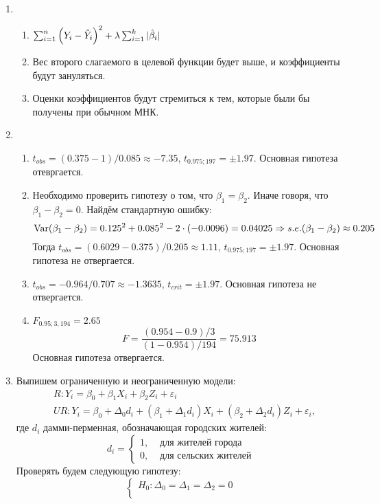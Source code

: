 \begin{enumerate}
\item
\begin{enumerate}
  \item $\sum_{i=1}^n \left(Y_i - \hat Y_i \right)^2 + \lambda \sum_{i=1}^k
  \vert \hat{\beta}_i \vert$
  \item Вес второго слагаемого в целевой функции будет выше, и коэффициенты будут
  зануляться.
  \item Оценки коэффициентов будут стремиться к тем, которые были бы получены
  при обычном МНК.
\end{enumerate}
\item
\begin{enumerate}
  \item $t_{obs} = (0.375 - 1) / 0.085 \approx -7.35$, $t_{0.975; 197} = \pm 1.97$.
  Основная гипотеза отевргается.
  \item Необходимо проверить гипотезу о том, что $\beta_1 = \beta_2$. Иначе говоря,
  что $\beta_1 - \beta_2 = 0$. Найдём стандартную ошибку:
  \[
  \operatorname{Var}(\beta_1 - \beta_2) = 0.125^2 + 0.085^2 - 2 \cdot (-0.0096) = 0.04025 \Rightarrow
  s.e.(\beta_1 - \beta_2) \approx 0.205
  \]
  Тогда $t_{obs} = (0.6029 - 0.375) / 0.205 \approx 1.11$, $t_{0.975; 197} = \pm 1.97$.
  Основная гипотеза не отвергается.
  \item $t_{obs} = -0.964 / 0.707 \approx -1.3635$, $t_{crit} = \pm 1.97$.
  Основная гипотеза не отвергается.
  \item $F_{0.95; 3, 194} = 2.65$
  \[
  F = \frac{(0.954 - 0.9) / 3}{(1 - 0.954) / 194} = 75.913
  \]
  Основная гипотеза отвергается.
\end{enumerate}
\item Выпишем ограниченную и неограниченную модели:
\begin{align*}
  &R: Y_i = \beta_0 + \beta_1 X_i + \beta_2 Z_i + \varepsilon_i \\
  &UR: Y_i = \beta_0 + \Delta_0 d_i + (\beta_1 + \Delta_1 d_i) X_i + (\beta_2 + \Delta_2 d_i) Z_i + \varepsilon_i,
\end{align*}
где $d_i$ дамми-перменная, обозначающая городских жителей:
\[
d_i =
\begin{cases}
1, & \text{ для жителей города} \\
0, & \text{ для сельских жителей}
\end{cases}
\]
Проверять будем следующую гипотезу:
\[
\begin{cases}
H_0: \Delta_0 = \Delta_1 = \Delta_2 = 0 \\

\end{cases}\]
\end{enumerate}
